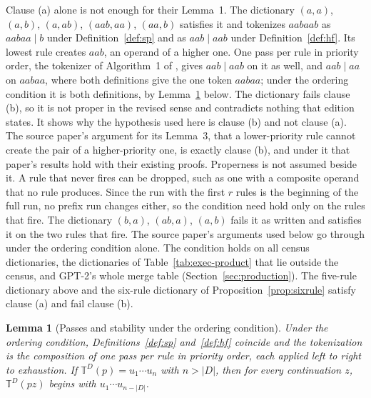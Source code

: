 \documentclass[11pt,a4paper]{article}
\theoremstyle{definition}
\theoremstyle{plain}
\newtheorem{lemma}{Lemma}
\newcommand{\T}{\mathbb{T}}
\begin{document}
Clause (a) alone is not enough for their Lemma~1. The dictionary \((a,a)\), \((a,b)\), \((a,ab)\), \((aab,aa)\),
\((aa,b)\) satisfies it and tokenizes \(aabaab\) as \(aabaa \mid b\) under Definition~\ref{def:sp} and as
\(aab \mid aab\) under Definition~\ref{def:hf}. Its lowest rule creates \(aab\), an operand of a higher one. One pass
per rule in priority order, the tokenizer of Algorithm~1 of \citet{berglund2024dfa}, gives \(aab \mid aab\) on it as
well, and \(aab \mid aa\) on \(aabaa\), where both definitions give the one token \(aabaa\); under the ordering
condition it is both definitions, by Lemma~\ref{lem:stab} below. The dictionary fails clause (b), so it is not proper in
the revised sense and contradicts nothing that edition states. It shows why the hypothesis used here is clause (b) and
not clause (a). The source paper's argument for its Lemma~3, that a lower-priority rule cannot create the pair of a
higher-priority one, is exactly clause (b), and under it that paper's results hold with their existing proofs.
Properness is not assumed beside it. A rule that never fires can be dropped, such as one with a composite operand that
no rule produces. Since the run with the first \(r\) rules is the beginning of the full run, no prefix run changes
either, so the condition need hold only on the rules that fire. The dictionary \((b, a)\), \((ab, a)\), \((a, b)\) fails
it as written and satisfies it on the two rules that fire. The source paper's arguments used below go through under the
ordering condition alone. The condition holds on all \CensusTotal{} census dictionaries, the \HardCases{} dictionaries
of Table~\ref{tab:exec-product} that lie outside the census, and GPT-2's whole merge table
(Section~\ref{sec:production}). The five-rule dictionary above and the six-rule dictionary of
Proposition~\ref{prop:sixrule} satisfy clause (a) and fail clause (b).


\begin{lemma}[Passes and stability under the ordering condition]\label{lem:stab}
Under the ordering condition, Definitions~\ref{def:sp} and~\ref{def:hf} coincide and the tokenization is the composition
of one pass per rule in priority order, each applied left to right to exhaustion. If \(\T^D(p) = u_1 \cdots u_n\) with
\(n > |D|\), then for every continuation \(z\), \(\T^D(pz)\) begins with \(u_1 \cdots u_{n - |D|}\).
\end{lemma}
\end{document}
